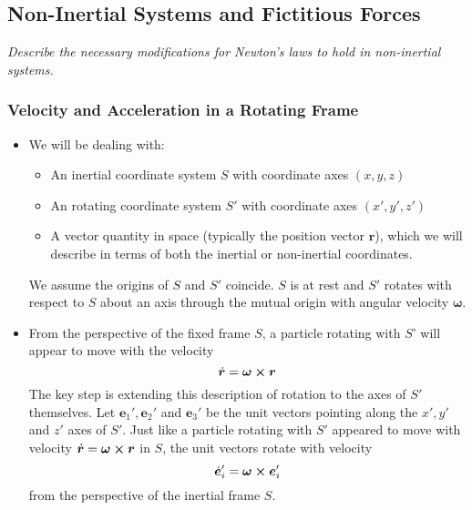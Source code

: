 \documentclass[11pt, a4paper]{article}
\newcommand{\e}{\bm{e}} %
\newcommand{\bdot}[1]{\dot{\bm{#1}}}
\begin{document}
\subsection{Non-Inertial Systems and Fictitious Forces}
\textit{Describe the necessary modifications for Newton's laws to hold in non-inertial systems.}

\subsubsection{Velocity and Acceleration in a Rotating Frame}

\begin{itemize}
	\item We will be dealing with:
	\begin{itemize}
		\item An inertial coordinate system $ S $ with coordinate axes $ (x, y, z) $
		\item An rotating coordinate system $ S' $ with coordinate axes $ (x', y', z') $
		\item A vector quantity in space (typically the position vector $ \bm{r} $), which we will describe in terms of both the inertial or non-inertial coordinates.
	\end{itemize} 
	We assume the origins of $ S $ and $ S' $ coincide. $ S $ is at rest and $ S' $ rotates with respect to $ S $ about an axis through the mutual origin with angular velocity $ \bm{\omega} $.
	
	
	\item From the perspective of the fixed frame $ S $, a particle rotating with $ S $' will appear to move with the velocity
	\begin{equation*}
		\bdot{r} = \bm{\omega} \cross \bm{r}
	\end{equation*}
	The key step is extending this description of rotation to the axes of $ S' $ themselves. Let $ \e_{1}', \e_{2}' $ and $ \e_{3}' $ be the unit vectors pointing along the $ x', y' $ and $ z' $ axes of $ S' $. Just like a particle rotating with $ S' $ appeared to move with velocity $ \bdot{r} = \bm{\omega} \cross \bm{r} $ in $ S $, the unit vectors rotate with velocity
	\begin{equation*}
		\dot{\e}_{i}' = \bm{\omega}\cross \e_{i}'
	\end{equation*}
	from the perspective of the inertial frame $ S $. 
	

\end{itemize}
\end{document}
